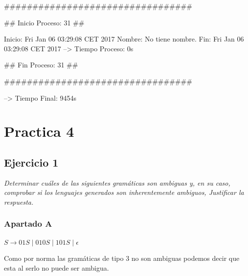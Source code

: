 \begin{itemize}
	\#\#\#\#\#\#\#\#\#\#\#\#\#\#\#\#\#\#\#\#\#\#\#\#\#\#\#\#\#\#\#\#\# \newline \newline
	
	\#\# Inicio Proceso: 31 \#\# \newline \newline
	
	Inicio: Fri Jan 06 03:29:08 CET 2017 \newline
	Nombre: No tiene nombre. \newline
	Fin: Fri Jan 06 03:29:08 CET 2017\newline
	--> Tiempo Proceso: 0s\newline \newline
	
	\#\# Fin Proceso: 31 \#\# \newline \newline
	
	\#\#\#\#\#\#\#\#\#\#\#\#\#\#\#\#\#\#\#\#\#\#\#\#\#\#\#\#\#\#\#\#\# \newline \newline \newline
	
	
	--> Tiempo Final: 9454s \newline
	
\end{itemize}

\newpage

\section{Practica 4}

\subsection{Ejercicio 1}

\textit{Determinar cuáles de las siguientes gramáticas son ambiguas y, en su caso, comprobar si los lenguajes generados son inherentemente ambiguos, Justificar la respuesta.}

\subsubsection{Apartado A}

$ S \rightarrow 01S \; | \; 010S \; | \; 101S \; | \; \epsilon $ \newline

Como por norma las gramáticas de tipo 3 no son ambiguas podemos decir que esta al serlo no puede ser ambigua. \newline

